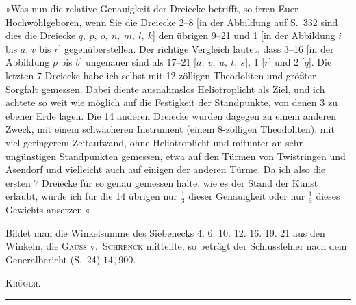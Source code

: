 \par\noindent\hspace*{\parindent}»Was nun die relative Genauigkeit der Dreiecke betrifft, so irren Euer Hochwohlgeboren, wenn Sie die Dreiecke 2--8 [in der Abbildung auf S.~332 sind dies die Dreiecke \(q,\ p,\ o,\ n,\ m,\ l,\ k\)] den übrigen 9--21 und 1 [in der Abbildung \(i\) bis \(a\), \(v\) bis \(r\)] gegenüberstellen. Der richtige Vergleich lautet, dass 3--16 [in der Abbildung \(p\) bis \(b\)]  ungenauer sind als 17--21 [\(a,\ v,\ u,\ t,\ s\)], 1 [\(r\)] und 2 [\(q\)]. Die letzten 7 Dreiecke habe ich selbst mit 12-zölligen Theodoliten und größter Sorgfalt gemessen. Dabei diente ausnahmslos Heliotroplicht als Ziel, und ich achtete so weit wie möglich auf die Festigkeit der Standpunkte, von denen 3 zu ebener Erde lagen. Die 14 anderen Dreiecke wurden dagegen zu einem anderen Zweck, mit einem schwächeren Instrument (einem 8-zölligen Theodoliten), mit viel geringerem Zeitaufwand, ohne Heliotroplicht und mitunter an sehr ungünstigen Standpunkten gemessen, etwa auf den Türmen von Twistringen und Asendorf und vielleicht auch auf einigen der anderen Türme. Da ich also die ersten 7 Dreiecke für so genau gemessen halte, wie es der Stand der Kunst erlaubt, würde ich für die 14 übrigen nur \(\frac{1}{3}\) dieser Genauigkeit oder nur \(\frac{1}{9}\) dieses Gewichts ansetzen.«

\par\noindent\hspace*{\parindent}Bildet man die Winkelsumme des Siebenecks 4. 6. 10. 12. 16. 19. 21 aus den Winkeln, die \textsc{Gauss} v.~\textsc{Schrenck} mitteilte, so beträgt der Schlussfehler nach dem Generalbericht (S.~24) \(14\overset{\prime\prime}{,}900\).
\begin{flushright}\textsc{Krüger.}\end{flushright}
\begin{center}\rule{.26\textwidth}{.4pt}\end{center}
